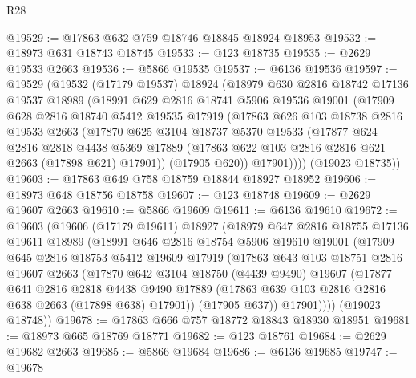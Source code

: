 \begin{lexlean}{R28}
\begin{coremodule}
@19529 := @17863 @632 @759 @18746 @18845 @18924 @18953
@19532 := @18973 @631 @18743 @18745
@19533 := @123 @18735
@19535 := @2629 @19533 @2663
@19536 := @5866 @19535
@19537 := @6136 @19536
@19597 := @19529
    (@19532
      (@17179 @19537)
      @18924
      (@18979
        @630
        @2816
        @18742
        @17136
        @19537
        @18989
        (@18991
          @629
          @2816
          @18741
          @5906
          @19536
          @19001
          (@17909
            @628
            @2816
            @18740
            @5412
            @19535
            @17919
            (@17863
              @626
              @103
              @18738
              @2816
              @19533
              @2663
              (@17870
                @625
                @3104
                @18737
                @5370
                @19533
                (@17877
                  @624
                  @2816
                  @2818
                  @4438
                  @5369
                  @17889
                  (@17863 @622 @103 @2816 @2816 @621 @2663 (@17898 @621) @17901))
                (@17905 @620))
              @17901))))
      (@19023 @18735))
@19603 := @17863 @649 @758 @18759 @18844 @18927 @18952
@19606 := @18973 @648 @18756 @18758
@19607 := @123 @18748
@19609 := @2629 @19607 @2663
@19610 := @5866 @19609
@19611 := @6136 @19610
@19672 := @19603
    (@19606
      (@17179 @19611)
      @18927
      (@18979
        @647
        @2816
        @18755
        @17136
        @19611
        @18989
        (@18991
          @646
          @2816
          @18754
          @5906
          @19610
          @19001
          (@17909
            @645
            @2816
            @18753
            @5412
            @19609
            @17919
            (@17863
              @643
              @103
              @18751
              @2816
              @19607
              @2663
              (@17870
                @642
                @3104
                @18750
                (@4439 @9490)
                @19607
                (@17877
                  @641
                  @2816
                  @2818
                  @4438
                  @9490
                  @17889
                  (@17863 @639 @103 @2816 @2816 @638 @2663 (@17898 @638) @17901))
                (@17905 @637))
              @17901))))
      (@19023 @18748))
@19678 := @17863 @666 @757 @18772 @18843 @18930 @18951
@19681 := @18973 @665 @18769 @18771
@19682 := @123 @18761
@19684 := @2629 @19682 @2663
@19685 := @5866 @19684
@19686 := @6136 @19685
@19747 := @19678

\end{coremodule}
\end{lexlean}
